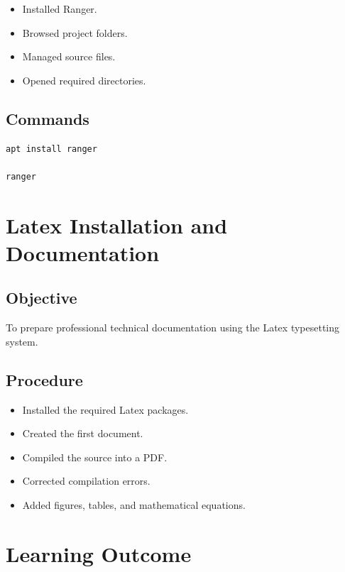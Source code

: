 \documentclass[12pt,a4paper]{report}
\begin{document}
\begin{itemize}
\item Installed Ranger.
\item Browsed project folders.
\item Managed source files.
\item Opened required directories.
\end{itemize}

\subsection{Commands}

\begin{lstlisting}[language=bash]
apt install ranger

ranger
\end{lstlisting}


\section{Latex Installation and Documentation}

\subsection{Objective}

To prepare professional technical documentation using the Latex typesetting system.

\subsection{Procedure}

\begin{itemize}
\item Installed the required Latex packages.
\item Created the first document.
\item Compiled the source into a PDF.
\item Corrected compilation errors.
\item Added figures, tables, and mathematical equations.
\end{itemize}


\section{Learning Outcome}
\end{document}

